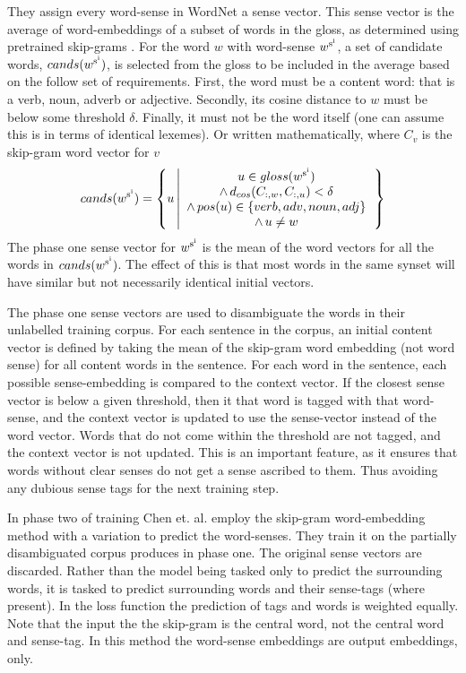 \documentclass[12pt,parskip]{komatufte}
\begin{document}
They assign every word-sense in WordNet a sense vector.
This sense vector is the average of word-embeddings of a subset of words in the gloss,
as determined using pretrained skip-grams \parencite{mikolov2013efficient}.
For the word $w$ with word-sense $\d w_{\n s_i}$,
a set of candidate words, $cands(\d w_{\n s_i})$, is selected from the gloss to be included in the average
based on the follow set of requirements.
First, the word must be a content word: that is a verb, noun, adverb or adjective.
Secondly, its cosine distance to $w$ must be below some threshold $\delta$.
Finally, it must not be the word itself (one can assume this is in terms of identical lexemes).
Or written mathematically, where $C_v$ is the skip-gram word vector for $v$
\begin{equation}
cands(\d w_{\n s_{i}})=\left\{ u\left|\begin{array}{c}
u \in gloss(\d w_{\n s_{i}})\\
\wedge\, d_{cos}(\i C_w, \i C_u)<\delta\\
\wedge\, pos(u)\in\left\{ verb,adv,noun,adj\right\} \\
\wedge\, u\ne w
\end{array}\right.\right\} 
\end{equation}
The phase one sense vector for $\d w_{\n s_i}$ is the mean of the word vectors for all the words in $cands(\d w_{\n s_{i}})$.
The effect of this is that most words in the same synset will have similar but not necessarily identical initial vectors.

The phase one sense vectors are used to disambiguate the words in their unlabelled training corpus.
For each sentence in the corpus, an initial content vector is defined by taking the mean of the skip-gram word embedding (not word sense) for all content words in the sentence.
For each word in the sentence, each possible sense-embedding is compared to the context vector.
If the closest sense vector is below a given threshold,
then it that word is tagged with that word-sense, and the context vector is updated to use the sense-vector instead of the word vector.
Words that do not come within the threshold are not tagged, and the context vector is not updated.
This is an important feature, as it ensures that words without clear senses do not get a sense ascribed to them.
Thus avoiding any dubious sense tags for the next training step.

In phase two of training
Chen et. al. employ the skip-gram word-embedding method with a variation to predict the word-senses.
They train it on the partially disambiguated corpus produces in phase one.
The original sense vectors are discarded.
Rather than the model being tasked only to predict the surrounding words, it is tasked to predict surrounding words and their sense-tags (where present).
In the loss function the prediction of tags and words is weighted equally.
Note that the input the the skip-gram is the central word, not the central word and sense-tag.
In this method the word-sense embeddings are output embeddings, only.
\end{document}

